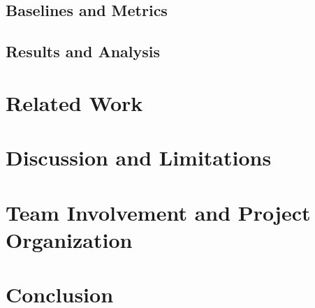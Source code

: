 \documentclass[conference]{IEEEtran}
\begin{document}
\subsection{Baselines and Metrics}

\subsection{Results and Analysis}

\section{Related Work}

\section{Discussion and Limitations}

\section{Team Involvement and Project Organization}

\section{Conclusion}
\end{document}
